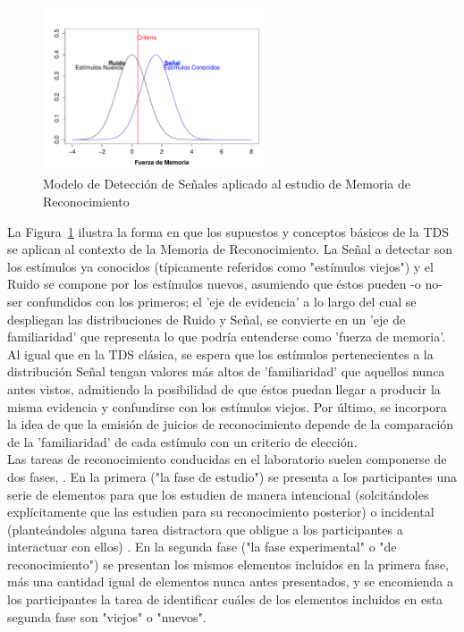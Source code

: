 \begin{figure}[th]
\centering
\includegraphics[width=0.60\textwidth]{Figures/RM_SDT_1} 
\decoRule
\caption[SDT en Memoria de Reconocimiento]{Modelo de Detección de Señales aplicado al estudio de Memoria de Reconocimiento}
\label{fig:RM_SDT_1}
\end{figure}

La Figura~\ref{fig:RM_SDT_1} ilustra la forma en que los supuestos y conceptos básicos de la TDS se aplican al contexto de la Memoria de Reconocimiento. La Señal a detectar son los estímulos ya conocidos (típicamente referidos como "estímulos viejos") y el Ruido se compone por los estímulos nuevos, asumiendo que éstos pueden -o no- ser confundidos con los primeros; el 'eje de evidencia' a lo largo del cual se despliegan las distribuciones de Ruido y Señal, se convierte en un 'eje de familiaridad' que representa lo que podría entenderse como 'fuerza de memoria'. Al igual que en la TDS clásica, se espera que los estímulos pertenecientes a la distribución Señal tengan valores más altos de 'familiaridad' que aquellos nunca antes vistos, admitiendo la posibilidad de que éstos puedan llegar a producir la misma evidencia y confundirse con los estímulos viejos. Por último, se incorpora la idea de que la emisión de juicios de reconocimiento depende de la comparación de la 'familiaridad' de cada estímulo con un criterio de elección.\\

Las tareas de reconocimiento conducidas en el laboratorio suelen componerse de dos fases, \parencite{Ratcliff1992}. En la primera ("la fase de estudio") se presenta a los participantes una serie de elementos para que los estudien de manera intencional (solcitándoles explícitamente que las estudien para su reconocimiento posterior) o incidental (planteándoles alguna tarea distractora que obligue a los participantes a interactuar con ellos) \parencite{Noldy1990}. En la segunda fase ("la fase experimental" o "de reconocimiento") se presentan los mismos elementos incluidos en la primera fase, más una cantidad igual de elementos nunca antes presentados, y se encomienda a los participantes la tarea de identificar cuáles de los elementos incluidos en esta segunda fase son "viejos" o "nuevos".\\









